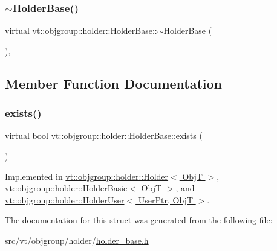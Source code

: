 \subsubsection{\texorpdfstring{$\sim$\+Holder\+Base()}{~HolderBase()}}
{\footnotesize\ttfamily virtual vt\+::objgroup\+::holder\+::\+Holder\+Base\+::$\sim$\+Holder\+Base (\begin{DoxyParamCaption}{ }\end{DoxyParamCaption})\hspace{0.3cm}{\ttfamily [virtual]}, {\ttfamily [default]}}



\subsection{Member Function Documentation}
\mbox{\label{structvt_1_1objgroup_1_1holder_1_1_holder_base_afeebbe358baf0b2bfea57f52807be564}} 
\subsubsection{\texorpdfstring{exists()}{exists()}}
{\footnotesize\ttfamily virtual bool vt\+::objgroup\+::holder\+::\+Holder\+Base\+::exists (\begin{DoxyParamCaption}{ }\end{DoxyParamCaption})\hspace{0.3cm}{\ttfamily [pure virtual]}}



Implemented in \hyperlink{structvt_1_1objgroup_1_1holder_1_1_holder_a0c18e5f4287e37e6a89a72df90e68273}{vt\+::objgroup\+::holder\+::\+Holder$<$ Obj\+T $>$}, \hyperlink{structvt_1_1objgroup_1_1holder_1_1_holder_basic_ab52459a275afea84f6650d206fe5b3dc}{vt\+::objgroup\+::holder\+::\+Holder\+Basic$<$ Obj\+T $>$}, and \hyperlink{structvt_1_1objgroup_1_1holder_1_1_holder_user_abba92cc4a99e045b64a1865fe1477fb2}{vt\+::objgroup\+::holder\+::\+Holder\+User$<$ User\+Ptr, Obj\+T $>$}.



The documentation for this struct was generated from the following file\+:\begin{DoxyCompactItemize}
\item 
src/vt/objgroup/holder/\hyperlink{holder__base_8h}{holder\+\_\+base.\+h}\end{DoxyCompactItemize}
